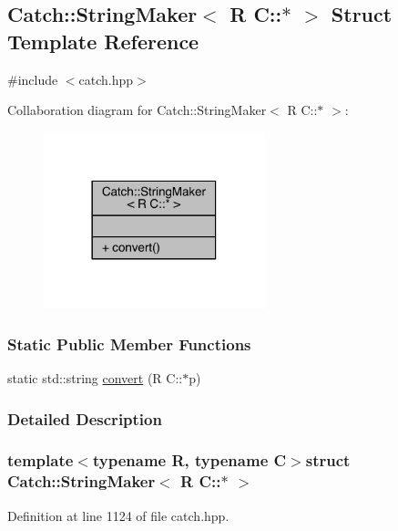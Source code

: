\hypertarget{a00079}{}\subsection{Catch\+:\+:String\+Maker$<$ R C\+:\+:$\ast$ $>$ Struct Template Reference}
\label{a00079}


{\ttfamily \#include $<$catch.\+hpp$>$}



Collaboration diagram for Catch\+:\+:String\+Maker$<$ R C\+:\+:$\ast$ $>$\+:\nopagebreak
\begin{figure}[H]
\begin{center}
\leavevmode
\includegraphics[width=182pt]{a00275}
\end{center}
\end{figure}
\subsubsection*{Static Public Member Functions}
\begin{DoxyCompactItemize}
\item 
static std\+::string \hyperlink{a00079_af69c15e0b406e945777137fe4a333731}{convert} (R C\+::$\ast$p)
\end{DoxyCompactItemize}


\subsubsection{Detailed Description}
\subsubsection*{template$<$typename R, typename C$>$struct Catch\+::\+String\+Maker$<$ R C\+::$\ast$ $>$}



Definition at line 1124 of file catch.\+hpp.



